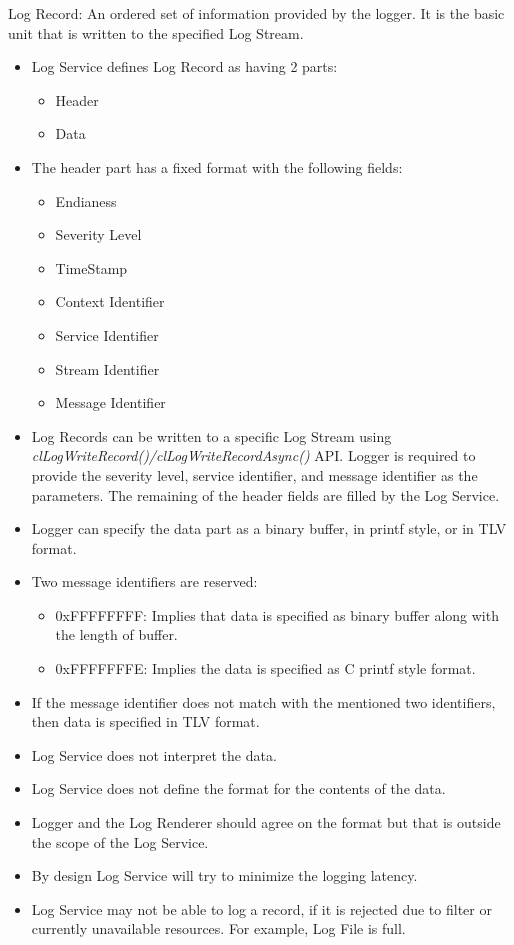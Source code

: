\begin{flushleft}
\begin{Desc}	
\item
[Log Record:] An ordered set of information provided by the logger. It is the basic unit that is written to the specified Log Stream.
\begin{itemize}
\item Log Service defines Log Record as having 2 parts:
\begin{itemize}
\item Header
\item	Data
\end{itemize}
\item The header part has a fixed format with the following fields:
\begin{itemize}
\item	Endianess
\item	Severity Level
\item	TimeStamp
\item	Context Identifier
\item	Service Identifier
\item	Stream Identifier
\item	Message Identifier
\end{itemize}
\item	Log Records can be written to a specific Log Stream using \textit{clLogWriteRecord()/clLogWriteRecordAsync()} API. Logger is required to provide the 
severity level, service identifier, and message identifier as the parameters. The remaining of the header fields are filled by the Log Service.
\item	Logger can specify the data part as a binary buffer, in printf style, or in TLV format.
\item	Two message identifiers are reserved:
\begin{itemize}
\item	0xFFFFFFFF: Implies that data is specified as binary buffer along with the length of buffer.
\item	0xFFFFFFFE: Implies the data is specified as C printf style format.  
\end{itemize}
\item	If the message identifier does not match with the mentioned two identifiers, then data is specified in TLV format.
\item	Log Service does not interpret the data. 
\item	Log Service does not define the format for the contents of the data.
\item	Logger and the Log Renderer should agree on the format but that is outside the scope of the Log Service.
\item	By design Log Service will try to minimize the logging latency.
\item	Log Service may not be able to log a record, if it is rejected due to filter or currently unavailable resources. For example, 
Log File is full.
\end{itemize}
\end{Desc}



\end{flushleft}
